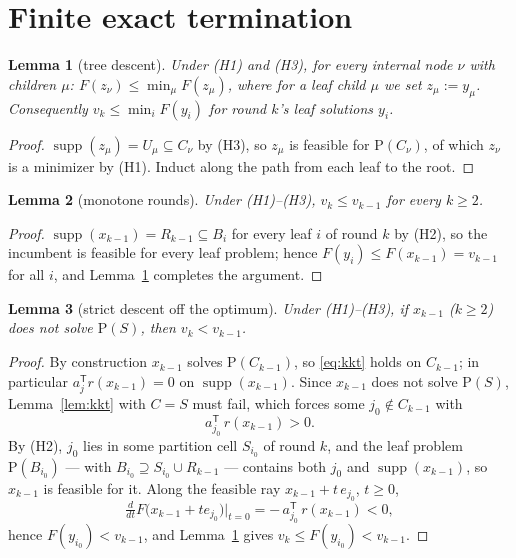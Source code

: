 \documentclass[pdflatex,sn-mathphys-num]{sn-jnl}
\theoremstyle{thmstyleone}
\newtheorem{lemma}{Lemma}
\theoremstyle{thmstyletwo}
\newcommand{\supp}{\operatorname{supp}}
\newcommand{\T}{{\mathsf T}}
\newcommand{\prob}[1]{\mathrm{P}(#1)}
\begin{document}
\section{Finite exact termination}\label{sec:main}

\begin{lemma}[tree descent]\label{lem:tree}
Under \emph{(H1)} and \emph{(H3)}, for every internal node $\nu$ with
children $\mu$: $F(z_\nu)\le\min_\mu F(z_\mu)$, where for a leaf child
$\mu$ we set $z_\mu:=y_\mu$. Consequently $v_k\le\min_i F(y_i)$ for
round $k$'s leaf solutions $y_i$.
\end{lemma}
\begin{proof}
$\supp(z_\mu)=U_\mu\subseteq C_\nu$ by (H3), so $z_\mu$ is feasible for
$\prob{C_\nu}$, of which $z_\nu$ is a minimizer by (H1). Induct along
the path from each leaf to the root.
\end{proof}

\begin{lemma}[monotone rounds]\label{lem:mono}
Under \emph{(H1)--(H3)}, $v_k\le v_{k-1}$ for every $k\ge2$.
\end{lemma}
\begin{proof}
$\supp(x_{k-1})=R_{k-1}\subseteq B_i$ for every leaf $i$ of round $k$
by (H2), so the incumbent is feasible for every leaf problem; hence
$F(y_i)\le F(x_{k-1})=v_{k-1}$ for all $i$, and Lemma~\ref{lem:tree}
completes the argument.
\end{proof}

\begin{lemma}[strict descent off the optimum]\label{lem:strict}
Under \emph{(H1)--(H3)}, if $x_{k-1}$ \emph{(}$k\ge2$\emph{)} does not
solve $\prob{S}$, then $v_k<v_{k-1}$.
\end{lemma}
\begin{proof}
By construction $x_{k-1}$ solves $\prob{C_{k-1}}$, so \eqref{eq:kkt}
holds on $C_{k-1}$; in particular $a_j^{\T}r(x_{k-1})=0$ on
$\supp(x_{k-1})$. Since $x_{k-1}$ does not solve $\prob{S}$,
Lemma~\ref{lem:kkt} with $C=S$ must fail, which forces some
$j_0\notin C_{k-1}$ with
\begin{equation*}
a_{j_0}^{\T}\,r(x_{k-1})>0 .
\end{equation*}
By (H2), $j_0$ lies in some partition cell $S_{i_0}$ of round $k$, and
the leaf problem $\prob{B_{i_0}}$ --- with
$B_{i_0}\supseteq S_{i_0}\cup R_{k-1}$ --- contains both $j_0$ and
$\supp(x_{k-1})$, so $x_{k-1}$ is feasible for it. Along the feasible
ray $x_{k-1}+t\,e_{j_0}$, $t\ge0$,
\begin{equation*}
\tfrac{d}{dt}F\bigl(x_{k-1}+te_{j_0}\bigr)\Big|_{t=0}
=-\,a_{j_0}^{\T}\,r(x_{k-1})<0,
\end{equation*}
hence $F(y_{i_0})<v_{k-1}$, and Lemma~\ref{lem:tree} gives
$v_k\le F(y_{i_0})<v_{k-1}$.
\end{proof}
\end{document}
